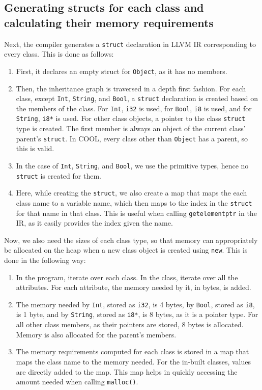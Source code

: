 \documentclass{article}
\begin{document}
\subsection{Generating structs for each class and calculating their memory requirements}
Next, the compiler generates a \verb|struct| declaration in LLVM IR corresponding to every class. This is done as follows:
\begin{enumerate}
	\item First, it declares an empty struct for \verb|Object|, as it has no members.
	\item Then, the inheritance graph is traversed in a depth first fashion. For each class, except \verb|Int|, \verb|String|, and \verb|Bool|, a \verb|struct| declaration is created based on the members of the class. For \verb|Int|, \verb|i32| is used, for \verb|Bool|, \verb|i8| is used, and for \verb|String|, \verb|i8*| is used. For other class objects, a pointer to the class \verb|struct| type is created. The first member is always an object of the current class' parent's \verb|struct|. In COOL, every class other than \verb|Object| has a parent, so this is valid.
	\item In the case of \verb|Int|, \verb|String|, and \verb|Bool|, we use the primitive types, hence no \verb|struct| is created for them.
	\item Here, while creating the \verb|struct|, we also create a map that maps the each class name to a variable name, which then maps to the index in the \verb|struct| for that name in that class. This is useful when calling \verb|getelementptr| in the IR, as it easily provides the index given the name.
\end{enumerate}

Now, we also need the sizes of each class type, so that memory can appropriately be allocated on the heap when a new class object is created using \verb|new|. This is done in the following way:
\begin{enumerate}
	\item In the program, iterate over each class. In the class, iterate over all the attributes. For each attribute, the memory needed by it, in bytes, is added.
	\item The memory needed by \verb|Int|, stored as \verb|i32|, is 4 bytes, by \verb|Bool|, stored as \verb|i8|, is 1 byte, and by \verb|String|, stored as \verb|i8*|, is 8 bytes, as it is a pointer type. For all other class members, as their pointers are stored, 8 bytes is allocated. Memory is also allocated for the parent's members.
	\item The memory requirements computed for each class is stored in a map that maps the class name to the memory needed. For the in-built classes, values are directly added to the map. This map helps in quickly accessing the amount needed when calling \verb|malloc()|.
\end{enumerate}
\end{document}
